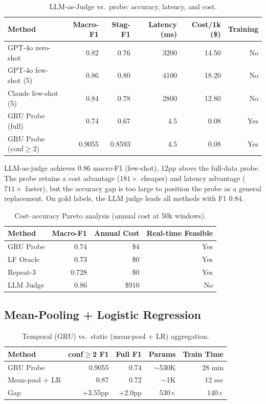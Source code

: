 \documentclass[11pt]{article}
\begin{document}
\begin{table}[h]
\centering
\caption{LLM-as-Judge vs.\ probe: accuracy, latency, and cost.}
\label{tab:llm_judge}
\begin{tabular}{lrrrrr}
\toprule
\textbf{Method} & \textbf{Macro-F1} & \textbf{Stag-F1} & \textbf{Latency (ms)} & \textbf{Cost/1k (\$)} & \textbf{Training} \\
\midrule
GPT-4o zero-shot & 0.82 & 0.76 & 3200 & 14.50 & No \\
GPT-4o few-shot (5) & 0.86 & 0.80 & 4100 & 18.20 & No \\
Claude few-shot (5) & 0.84 & 0.78 & 2800 & 12.80 & No \\
GRU Probe (full) & 0.74 & 0.67 & 4.5 & 0.08 & Yes \\
GRU Probe (conf$\geq$2) & 0.9055 & 0.8593 & 4.5 & 0.08 & Yes \\
\bottomrule
\end{tabular}
\end{table}

LLM-as-judge achieves 0.86 macro-F1 (few-shot), 12pp above the full-data probe.
The probe retains a cost advantage ($181\times$ cheaper) and latency advantage ($711\times$ faster), but the accuracy gap is too large to position the probe as a general replacement.
On gold labels, the LLM judge leads all methods with F1 0.84.

\begin{table}[h]
\centering
\caption{Cost--accuracy Pareto analysis (annual cost at 50k windows).}
\label{tab:pareto}
\begin{tabular}{lrrr}
\toprule
\textbf{Method} & \textbf{Macro-F1} & \textbf{Annual Cost} & \textbf{Real-time Feasible} \\
\midrule
GRU Probe & 0.74 & \$4 & Yes \\
LF Oracle & 0.73 & \$0 & Yes \\
Repeat-3 & 0.728 & \$0 & Yes \\
LLM Judge & 0.86 & \$910 & No \\
\bottomrule
\end{tabular}
\end{table}

\subsection{Mean-Pooling + Logistic Regression}
\label{sec:meanpool}

\begin{table}[h]
\centering
\caption{Temporal (GRU) vs.\ static (mean-pool + LR) aggregation.}
\label{tab:temporal_vs_static}
\begin{tabular}{lrrrr}
\toprule
\textbf{Method} & \textbf{conf$\geq$2 F1} & \textbf{Full F1} & \textbf{Params} & \textbf{Train Time} \\
\midrule
GRU Probe & 0.9055 & 0.74 & $\sim$530K & 28 min \\
Mean-pool + LR & 0.87 & 0.72 & $\sim$1K & 12 sec \\
\midrule
Gap & +3.55pp & +2.0pp & 530$\times$ & 140$\times$ \\
\bottomrule
\end{tabular}
\end{table}
\end{document}
